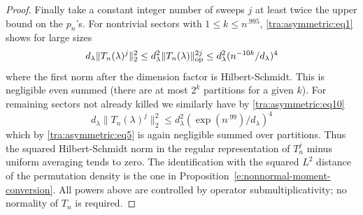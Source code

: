 \begin{proof}\label{tra:asymmetric:mixing-proof}
\label{tra:asymmetric:fourier-completion}
Finally take a constant integer number of sweeps \(j\) at least twice the upper bound on the \(p_n\)'s. For nontrivial sectors with \(1\le k\le n^{.995}\), \eqref{tra:asymmetric:eq1} shows for large sizes
\[
            d_\lambda \| T_n(\lambda)^j \|_2^2
                   \le d_\lambda^2 \| T_n(\lambda)\|_{\rm op}^{2j}
                   \le d_\lambda^2 (n^{-10k}/d_\lambda)^4
\]
where the first norm after the dimension factor is Hilbert-Schmidt. This is negligible even summed (there are at most \(2^k\) partitions for a given \(k\)). For remaining sectors not already killed we similarly have by \eqref{tra:asymmetric:eq10}
\[
          d_\lambda \| T_n(\lambda)^j\|_2^2
                  \le d_\lambda^2 (\exp(n^{.99})/d_\lambda)^4
\]
which by \eqref{tra:asymmetric:eq5} is again negligible summed over partitions. Thus the squared Hilbert-Schmidt norm in the regular representation of \(T_n^j\) minus uniform averaging tends to zero. The identification with the squared $L^2$ distance of the permutation
density is the one in Proposition~\ref{e:nonnormal-moment-conversion}.
All powers above are controlled by operator submultiplicativity; no
normality of $T_n$ is required.
\end{proof}
